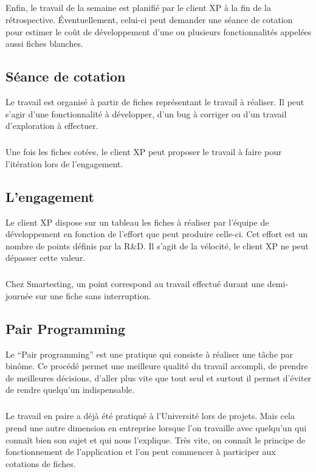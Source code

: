 \subparagraph*{}
Enfin, le travail de la semaine est planifié par le client XP à la fin de la rétrospective. Éventuellement, celui-ci peut demander une séance de cotation pour estimer le coût de développement d’une ou plusieurs fonctionnalités appelées aussi fiches blanches.

\subsection{Séance de cotation}

Le travail est organisé à partir de fiches représentant le travail à réaliser. Il peut s’agir d’une fonctionnalité à développer, d'un bug à corriger ou d'un travail d’exploration à effectuer.

\subparagraph*{}
Une fois les fiches cotées, le client XP peut proposer le travail à faire pour l’itération lors de l’engagement.

\subsection{L'engagement}

Le client XP dispose sur un tableau les fiches à réaliser par l’équipe de développement en fonction de l’effort que peut produire celle-ci. 
Cet effort est un nombre de points définis par la R\&D. 
Il s’agit de la vélocité, le client XP ne peut dépasser cette valeur.

\subparagraph*{}
Chez Smartesting, un point correspond au travail effectué durant une demi-journée sur une fiche sans interruption.

\subsection{Pair Programming}

Le ``Pair programming'' est une pratique qui consiste à réaliser une tâche par binôme. 
Ce procédé permet une meilleure qualité du travail accompli, de prendre de meilleures décisions, d'aller plus vite que tout seul et surtout il permet d'éviter de rendre quelqu'un indispensable.

\subparagraph*{}
Le travail en paire a déjà été pratiqué à l'Université lors de projets.
Mais cela prend une autre dimension en entreprise lorsque l'on travaille avec quelqu'un qui connaît bien son sujet et qui nous l'explique. 
Très vite, on connaît le principe de fonctionnement de l'application et l'on peut commencer à participer aux cotations de fiches.

